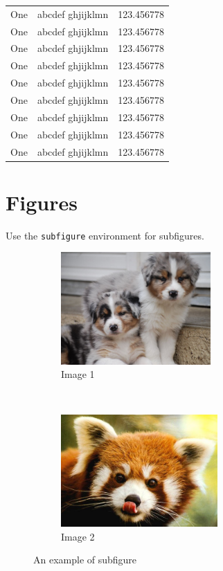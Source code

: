 \begin{xltabular}{\linewidth}{RRR}
  One & abcdef ghjijklmn & 123.456778 \\
  One & abcdef ghjijklmn & 123.456778 \\
  One & abcdef ghjijklmn & 123.456778 \\
  One & abcdef ghjijklmn & 123.456778 \\
  One & abcdef ghjijklmn & 123.456778 \\
  One & abcdef ghjijklmn & 123.456778 \\
  One & abcdef ghjijklmn & 123.456778 \\
  One & abcdef ghjijklmn & 123.456778 \\
  One & abcdef ghjijklmn & 123.456778 \\
\end{xltabular}

\section{Figures}

Use the \texttt{subfigure} environment for subfigures.

\begin{figure}[htbp]
    \centering
    \begin{subfigure}[t]{0.47\linewidth}
        \centering
        \includegraphics[height=4.3cm]{figs/img1}
        \caption{Image 1}
    \end{subfigure}
    ~
    \begin{subfigure}[t]{0.47\linewidth}
        \centering
        \includegraphics[height=4.3cm]{figs/img2}
        \caption{Image 2}
    \end{subfigure}
\caption{An example of subfigure}
\end{figure}
